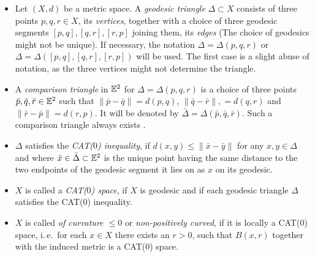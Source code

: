 
\begin{defin}
  \label{def:cat}
  \begin{itemize}
  \item Let \((X,d)\) be a metric space. A \emph{geodesic triangle} \(\Delta \subset X\) consists of three points \(p,q,r \in X\), its \emph{vertices}, together with a choice of three geodesic segments \([p,q], [q,r], [r, p]\) joining them, its \emph{edges} (The choice of geodesics might not be unique). If necessary, the notation \(\Delta = \Delta(p,q,r)\) or \(\Delta = \Delta([p,q], [q,r], [r,p])\) will be used. The first case is a slight abuse of notation, as the three vertices might not determine the triangle.
  \item A \emph{comparison triangle} in \(\mathbb{E}^2\) for \(\Delta = \Delta(p,q,r)\) is a choice of three points \(\bar p, \bar q, \bar r \in \mathbb{E}^2\) such that \(\|\bar p- \bar q\| = d(p, q)\), \(\|\bar q- \bar r\|, = d(q, r)\) and \(\|\bar r- \bar p\| = d(r, p)\). It will be denoted by \(\bar \Delta = \Delta(\bar p, \bar q, \bar r)\). Such a comparison triangle always exists \cite[c.\,f.][Sec.\ I.2]{MR1744486}.
  \item \(\Delta\) satisfies the \emph{CAT(\(0\)) inequality}, if \(d(x,y) \leq \|\bar x- \bar y\|\) for any \(x, y \in \Delta\) and where \(\bar x \in \bar \Delta \subset \mathbb{E}^2\) is the unique point having the same distance to the two endpoints of the geodesic segment it lies on as \(x\) on its geodesic.
  \item \(X\) is called a \emph{CAT(\(0\)) space}, if \(X\) is geodesic and if each geodesic triangle \(\Delta\) satisfies the CAT(\(0\)) inequality.
  \item \(X\) is called \emph{of curvature \(\leq 0\)} or \emph{non-positively curved}, if it is locally a CAT(\(0\)) space, i.\,e.\ for each \(x \in X\) there exists an \(r > 0\), such that \(B(x,r)\) together with the induced metric is a CAT(\(0\)) space.
  \end{itemize}
\end{defin}

